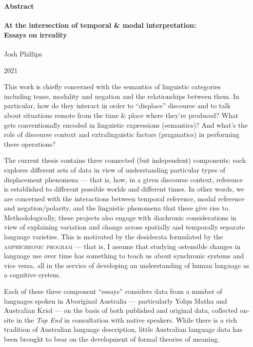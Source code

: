 {\sf\begin{center}
	\textbf{Abstract}\\
	
	\mbox{}\\
	
	{\Large \textbf{At the intersection of temporal \& modal interpretation:}}\\
	
	{\large \textbf{Essays on irreality}}\\
	
	\mbox{}\\
	
	Josh Phillips
	
	2021
\end{center}\doublespacing
{}
\noindent This work is chiefly concerned with the semantics of linguistic categories including tense, modality and negation and the relationships between them. In particular, how do they interact in order to ``displace'' discourse and to talk about situations remote from the time \& place where they're produced? What gets conventionally encoded in linguistic expressions (semantics)? And what's the role of discourse context and extralinguistic factors (pragmatics) in performing these operations?

The current thesis contains three connected (but independent) components; each explores different sets of data in view of understanding particular types of displacement phenomena --- that is, how, in a given discourse context, reference is established to different possible worlds and different times. In other words, we are concerned with the interactions between temporal reference, modal reference and negation/polarity, and the linguistic phenomena that these give rise to. Methodologically, these projects also engage with diachronic considerations in view of explaining variation and change across spatially and temporally separate language varieties. This is motivated by the desiderata formulated by the \textsc{amphichronic program} --- that is, I assume that studying ostensible changes in language use over time has something to teach us about synchronic systems and vice versa, all in the service of developing an understanding of human language as a cognitive system.


Each of these three component ``essays'' considers data from a number of languages spoken in Aboriginal Australia --- particularly Yolŋu Matha and Australian Kriol --- on the basis of both published and original data, collected on-site in the \textit{Top End} in consultation with native speakers. While there is a rich tradition of Australian language description, little Australian language data has been brought to bear on the development of formal theories of meaning. 

}
